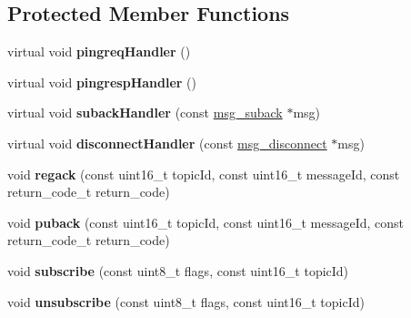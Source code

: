 \subsection*{Protected Member Functions}
\begin{DoxyCompactItemize}
\item 
\hypertarget{classThingClient_a7c3221f6d72ce2e47a783a0815171345}{virtual void {\bfseries pingreq\-Handler} ()}\label{classThingClient_a7c3221f6d72ce2e47a783a0815171345}

\item 
\hypertarget{classThingClient_ac4ab103343209f93a0cbeab0d5761a1c}{virtual void {\bfseries pingresp\-Handler} ()}\label{classThingClient_ac4ab103343209f93a0cbeab0d5761a1c}

\item 
\hypertarget{classThingClient_ac66bac1316dfe88086278835cca1e1d2}{virtual void {\bfseries suback\-Handler} (const \hyperlink{structmsg__suback}{msg\-\_\-suback} $\ast$msg)}\label{classThingClient_ac66bac1316dfe88086278835cca1e1d2}

\item 
\hypertarget{classThingClient_ab807f216f8c25cd40800959ebec71dab}{virtual void {\bfseries disconnect\-Handler} (const \hyperlink{structmsg__disconnect}{msg\-\_\-disconnect} $\ast$msg)}\label{classThingClient_ab807f216f8c25cd40800959ebec71dab}

\item 
\hypertarget{classThingClient_ab8bc8252846e50800c5dc0543e7b0309}{void {\bfseries regack} (const uint16\-\_\-t topic\-Id, const uint16\-\_\-t message\-Id, const return\-\_\-code\-\_\-t return\-\_\-code)}\label{classThingClient_ab8bc8252846e50800c5dc0543e7b0309}

\item 
\hypertarget{classThingClient_aca0d151dc7fafd12c564810a4a57d353}{void {\bfseries puback} (const uint16\-\_\-t topic\-Id, const uint16\-\_\-t message\-Id, const return\-\_\-code\-\_\-t return\-\_\-code)}\label{classThingClient_aca0d151dc7fafd12c564810a4a57d353}

\item 
\hypertarget{classThingClient_a672b424a4c7db25c6c9c851ab65688a3}{void {\bfseries subscribe} (const uint8\-\_\-t flags, const uint16\-\_\-t topic\-Id)}\label{classThingClient_a672b424a4c7db25c6c9c851ab65688a3}

\item 
\hypertarget{classThingClient_a3c0f6a25ffa7b1cfa5c17b82a4b1125b}{void {\bfseries unsubscribe} (const uint8\-\_\-t flags, const uint16\-\_\-t topic\-Id)}\label{classThingClient_a3c0f6a25ffa7b1cfa5c17b82a4b1125b}


\end{DoxyCompactItemize}
